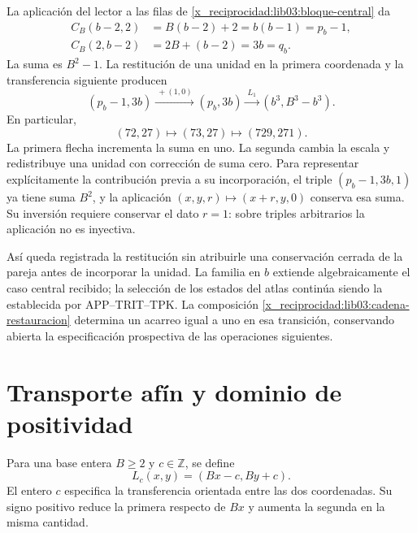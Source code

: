 La aplicación del lector a las filas de \eqref{x_reciprocidad:lib03:bloque-central} da
\begin{align}
 C_B(b-2,2)&=B(b-2)+2=b(b-1)=p_b-1,\\
 C_B(2,b-2)&=2B+(b-2)=3b=q_b.
 \label{x_reciprocidad:lib03:concatenaciones}
\end{align}
La suma es \(B^2-1\). La restitución de una unidad en la primera
coordenada y la transferencia siguiente producen
\begin{equation}
 (p_b-1,3b)\xrightarrow{\ +(1,0)\ }(p_b,3b)
 \xrightarrow{\ L_1\ }(b^3,B^3-b^3).
 \label{x_reciprocidad:lib03:cadena-restauracion}
\end{equation}
En particular,
\begin{equation}
 (72,27)\longmapsto(73,27)\longmapsto(729,271).
 \label{x_reciprocidad:lib03:cadena-central}
\end{equation}
La primera flecha incrementa la suma en uno. La segunda cambia la escala
y redistribuye una unidad con corrección de suma cero. Para representar
explícitamente la contribución previa a su incorporación, el triple
\((p_b-1,3b,1)\) ya tiene suma \(B^2\), y la aplicación
\((x,y,r)\mapsto(x+r,y,0)\) conserva esa suma. Su inversión requiere
conservar el dato \(r=1\): sobre triples arbitrarios la aplicación no
es inyectiva.

Así queda registrada la restitución sin atribuirle una conservación
cerrada de la pareja antes de incorporar la unidad. La familia en \(b\)
extiende algebraicamente el caso central recibido; la selección de los
estados del atlas continúa siendo la establecida por APP--TRIT--TPK.
La composición \eqref{x_reciprocidad:lib03:cadena-restauracion} determina un acarreo
igual a uno en esa transición, conservando abierta la especificación
prospectiva de las operaciones siguientes.

\section{Transporte afín y dominio de positividad}
\label{x_reciprocidad:lib03:afin}

\begin{definition}
\label{x_reciprocidad:lib03:def-transporte}
Para una base entera \(B\geq2\) y \(c\in\mathbb Z\), se define
\begin{equation}
 L_c(x,y)=(Bx-c,By+c).
 \label{x_reciprocidad:lib03:lc}
\end{equation}
El entero \(c\) especifica la transferencia orientada entre las dos
coordenadas. Su signo positivo reduce la primera respecto de \(Bx\)
y aumenta la segunda en la misma cantidad.
\end{definition}

